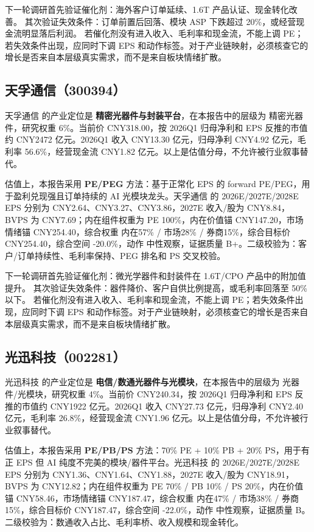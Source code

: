 下一轮调研首先验证催化剂：海外客户订单延续、1.6T 产品认证、现金转化改善。 其次验证失效条件：订单前置后回落、模块 ASP 下跌超过 20\%，或经营现金流明显落后利润。 若催化剂没有进入收入、毛利率和现金流，不能上调 PE；若失效条件出现，应同时下调 EPS 和动作标签。对于产业链映射，必须核查它的增长是否来自本层级真实需求，而不是来自板块情绪扩散。


\subsection{天孚通信（300394）}
天孚通信 的产业定位是 \textbf{精密光器件与封装平台}，在本报告中的层级为 精密光器件，研究权重 6\%。当前价 CNY318.00，按 2026Q1 归母净利和 EPS 反推的市值约 CNY2472 亿元。2026Q1 收入 CNY13.30 亿元，归母净利 CNY4.92 亿元，毛利率 56.6\%，经营现金流 CNY1.82 亿元。以上是估值分母，不允许被行业叙事替代。

估值上，本报告采用 \textbf{PE/PEG} 方法：基于正常化 EPS 的 forward PE/PEG，用于盈利兑现强且订单持续的 AI 光模块龙头。天孚通信 的 2026E/2027E/2028E EPS 分别为 CNY2.64、CNY3.27、CNY3.86，2027E 收入/股为 CNY8.84，BVPS 为 CNY7.69；内在组件权重为 PE 100\%，内在价值锚 CNY147.20，市场情绪锚 CNY254.40，综合权重 内在57\% / 市场28\% / 券商15\%，综合目标价 CNY254.40，综合空间 -20.0\%，动作 中性观察，证据质量 B+。二级校验为：客户/订单持续性、毛利率保持、PEG 排名和 PS 交叉校验。

下一轮调研首先验证催化剂：微光学器件和封装件在 1.6T/CPO 产品中的附加值提升。 其次验证失效条件：器件降价、客户自供比例提高，或毛利率回落至 50\%以下。 若催化剂没有进入收入、毛利率和现金流，不能上调 PE；若失效条件出现，应同时下调 EPS 和动作标签。对于产业链映射，必须核查它的增长是否来自本层级真实需求，而不是来自板块情绪扩散。


\subsection{光迅科技（002281）}
光迅科技 的产业定位是 \textbf{电信/数通光器件与光模块}，在本报告中的层级为 光器件/光模块，研究权重 4\%。当前价 CNY240.34，按 2026Q1 归母净利和 EPS 反推的市值约 CNY1922 亿元。2026Q1 收入 CNY27.73 亿元，归母净利 CNY2.40 亿元，毛利率 26.8\%，经营现金流 CNY1.96 亿元。以上是估值分母，不允许被行业叙事替代。

估值上，本报告采用 \textbf{PE/PB/PS} 方法：70\% PE + 10\% PB + 20\% PS，用于有正 EPS 但 AI 纯度不完美的模块/器件平台。光迅科技 的 2026E/2027E/2028E EPS 分别为 CNY1.36、CNY1.64、CNY1.88，2027E 收入/股为 CNY18.91，BVPS 为 CNY12.82；内在组件权重为 PE 70\% / PB 10\% / PS 20\%，内在价值锚 CNY58.46，市场情绪锚 CNY187.47，综合权重 内在47\% / 市场38\% / 券商15\%，综合目标价 CNY187.47，综合空间 -22.0\%，动作 中性观察，证据质量 B。二级校验为：数通收入占比、毛利率桥、收入规模和现金转化。

